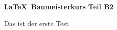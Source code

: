 \documentclass[a4paper]{article}
\begin{document}
\begin{center}
\begin{large}
\textbf{\LaTeX\ Baumeisterkurs Teil B2} \newline
\end{large}
\end{center}


Das ist der erste Test
\end{document}
